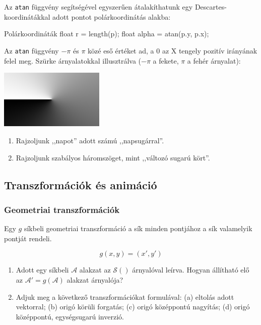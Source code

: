 Az \texttt{atan} függvény segítségével egyszerűen átalakíthatunk egy Descartes-koordinátákkal adott
pontot polárkoordinátás alakba:

\begin{glsl}{Polárkoordináták}
float r = length(p);
float alpha = atan(p.y, p.x);
\end{glsl}

Az \texttt{atan} függvény $-\pi$ és $\pi$ közé eső értéket ad, a 0 az X tengely pozitív irányának felel meg.
Szürke árnyalatokkal illusztrálva ($-\pi$ a fekete, $\pi$ a fehér árnyalat):

\includegraphics[width=5cm]{images/atan.png}

\progfeladatok

\begin{enumerate}[resume]
  \item Rajzoljunk ,,napot'' adott számú ,,napsugárral''.
  \item Rajzoljunk szabályos háromszöget, mint ,,változó sugarú kört''.
\end{enumerate}

\subsection{Transzformációk és animáció}

\subsubsection{Geometriai transzformációk}

Egy $g$ síkbeli geometriai transzformáció a sík minden pontjához a sík valamelyik pontját rendeli.

$$g(x, y) = (x', y')$$

\matfeladatok

\begin{enumerate}[resume]
  \item Adott egy síkbeli $\mathcal{A}$ alakzat az $\mathcal{S}()$ árnyalóval leírva. Hogyan állítható elő
  az $\mathcal{A}' = g(\mathcal{A})$ alakzat árnyalója?
  \item Adjuk meg a következő transzformációkat formulával:
  (a) eltolás adott vektorral;
  (b) origó körüli forgatás;
  (c) origó középpontú nagyítás;
  (d) origó középpontú, egységsugarú inverzió.
\end{enumerate}

